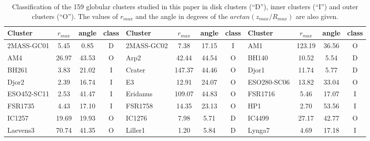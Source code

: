         \tiny
        \begin{table}
            \caption[Classification of the 159 globular clusters studied in this chapter as Disk, Inner, or Outer clusters]{Classification of the 159 globular clusters studied in this paper in disk clusters (``D''), inner clusters (``I'') and outer clusters (``O''). The values of $r_{max}$ and the angle in degrees of the $arctan(z_{max}/R_{max})$ are also given.}\label{classification}
            \tiny
            \begin{tabular}{l | c | c | c | l | c | c | c | l | c | c | c}
            \hline
                Cluster &    $r_{max}$ &  angle & class & Cluster &    $r_{max}$ &  angle & class & Cluster &    $r_{max}$ &  angle & class \\
                        \hline \hline
            2MASS-GC01 &   5.45 &   0.85 &              D &
            2MASS-GC02 &   7.38 &  17.15 &              I &
                    AM1 & 123.19 &  36.56 &              O \\
                    AM4 &  26.97 &  43.53 &              O &
                    Arp2 &  42.44 &  44.54 &              O &
                    BH140 &  10.52 &   5.54 &              D \\
                    BH261 &   3.83 &  21.02 &              I &
                Crater & 147.37 &  44.46 &              O &
                    Djor1 &  11.74 &   5.77 &              D \\
                    Djor2 &   2.39 &  16.74 &              I &
                    E3 &  12.91 &  24.07 &              O &
            ESO280-SC06 &  13.82 &  33.04 &              O \\
            ESO452-SC11 &   2.53 &  41.47 &              I &
                Eridanus & 109.07 &  44.83 &              O &
                FSR1716 &   5.46 &  17.07 &              I \\
                FSR1735 &   4.43 &  17.10 &              I &
                FSR1758 &  14.35 &  23.13 &              O &
                    HP1 &   2.70 &  53.56 &              I \\
                IC1257 &  19.69 &  19.93 &              O &
                IC1276 &   7.98 &   5.71 &              D &
                IC4499 &  27.17 &  42.77 &              O \\
                Laevens3 &  70.74 &  41.35 &              O &
                Liller1 &   1.20 &   5.84 &              D &
                Lynga7 &   4.69 &  17.18 &              I \\

\end{tabular}
\end{table}

